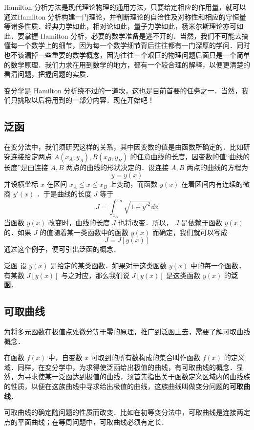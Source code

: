
Hamilton 分析方法是现代理论物理的通用方法，只要给定相应的作用量，就可以通过Hamilton 分析构建一门理论，并判断理论的自洽性及对称性和相应的守恒量等诸多性质．经典力学如此，相对论如此，量子力学如此，杨米尔斯理论亦可如此．要掌握 Hamilton 分析，必要的数学准备是逃不开的．当然，我们不可能去搞懂每一个数学上的细节，因为每一个数学细节背后往往都有一门深厚的学问．同时也不该漏掉一些重要的数学概念，因为往往一个艰巨的物理问题后面只是一个简单的数学原理．我们力求在用到数学的地方，都有一个较合理的解释，以便更清楚的看清问题，把握问题的实质．

变分学是 Hamilton 分析绕不过的一道坎，这也是目前首要的任务之一．当然，我们只挑取以后将用到的一部分内容．现在开始吧！
\subsection{泛函}
在变分法中，我们须研究这样的关系，其中因变数的值是由函数所确定的．比如研究连接给定两点 $A(x_A,y_A),B(x_B,y_B)$ 的任意曲线的长度，因变数的值“曲线的长度”是由连接 $A,B$ 两点的曲线的形状决定的．设连接 $A,B$ 两点的曲线的方程为
\begin{equation}
y=y(x)
\end{equation}
并设横坐标 $x$ 在区间 $x_A\leq x\leq x_B$ 上变动，而函数 $y(x)$ 在着区间内有连续的微商 $y'(x)$ ．于是曲线的长度 $J$ 等于
\begin{equation}
J=\int_{x_A}^{x_B} \sqrt{1+y'^2}\dd x
\end{equation}
当函数 $y(x)$ 改变时，曲线的长度 $J$ 也将改变．所以， $J$ 是依赖于函数 $y(x)$ 的．如果 $J$ 的值随着某一类函数中的函数 $y(x)$ 而确定，我们就可以写成
\begin{equation}
J=J[y(x)]
\end{equation}
通过这个例子，便可引出泛函的概念．
\begin{definition}{泛函}
设 $y(x)$ 是给定的某类函数．如果对于这类函数 $y(x)$ 中的每一个函数，有某数 $J[y(x)]$ 与之对应，那么我们说 $J[y(x)]$ 是这类函数 $y(x)$ 的\textbf{泛函}．
\end{definition}
\subsection{可取曲线}
为将多元函数在极值点处微分等于零的原理，推广到泛函上去，需要了解可取曲线概念．

在函数 $f(x)$ 中，自变数 $x$ 可取到的所有数构成的集合叫作函数 $f(x)$ 的定义域．同样，在变分学中，为求得使泛函给出极值的曲线，有可取曲线的概念．显然，为寻求使某一泛函达到极值的曲线，须首先指出关于函数定义区域内的曲线族的性质，以便在这族曲线中寻求给出极值的曲线，这族曲线叫做变分问题的\textbf{可取曲线}．

可取曲线的确定随问题的性质而改变．比如在初等变分法中，可取曲线是连接两定点的平面曲线；在等周问题中，可取曲线必须有定长．